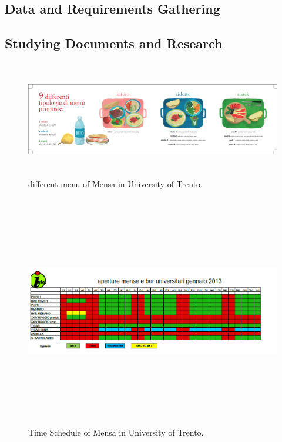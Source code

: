 \begin{appendices}
\chapter{Data and Requirements Gathering}
\section{Studying Documents and Research}
\label{sec:MenuAppendix}
\begin{figure}[h!t]
    \centering
      \includegraphics[width=5.5in,height=2in]{ch3/AppendixMenu/differentmenu}
  \caption{different menu of Mensa in University of Trento.}
  \label{differentmenu}
\end{figure}
\newpage \begin{figure}[h!t]
    \centering
      \includegraphics[width=5.5in,height=4in]{ch3/AppendixMenu/timeschedule}
  \caption{Time Schedule of Mensa in University of Trento.}
  \label{timeschedule}
\end{figure}
\newpage \begin{figure}[h!t]

\end{figure}
\end{appendices}
